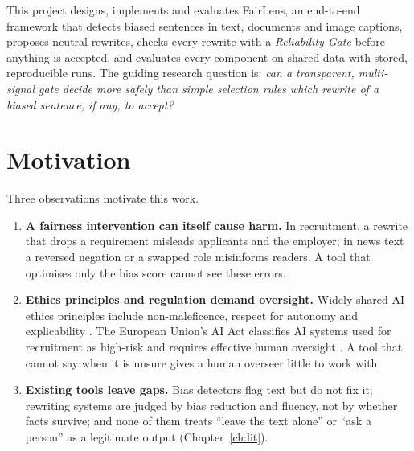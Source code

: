 \documentclass[12pt,a4paper,oneside]{report}
\begin{document}
This project designs, implements and evaluates FairLens, an end-to-end framework that detects biased sentences in text,
documents and image captions, proposes neutral rewrites, checks every rewrite with a \emph{Reliability Gate} before
anything is accepted, and evaluates every component on shared data with stored, reproducible runs. The guiding research
question is: \emph{can a transparent, multi-signal gate decide more safely than simple selection rules which rewrite of
a biased sentence, if any, to accept?}

\section{Motivation}
Three observations motivate this work.

\begin{enumerate}
\item \textbf{A fairness intervention can itself cause harm.} In recruitment, a rewrite that drops a requirement
misleads applicants and the employer; in news text a reversed negation or a swapped role misinforms readers. A tool that
optimises only the bias score cannot see these errors.
\item \textbf{Ethics principles and regulation demand oversight.} Widely shared AI ethics principles include
non-maleficence, respect for autonomy and explicability \cite{floridi,jobin}. The European Union's AI Act classifies AI
systems used for recruitment as high-risk and requires effective human oversight \cite{euaiact}. A tool that cannot say
when it is unsure gives a human overseer little to work with.
\item \textbf{Existing tools leave gaps.} Bias detectors flag text but do not fix it; rewriting systems are judged by
bias reduction and fluency, not by whether facts survive; and none of them treats ``leave the text alone'' or ``ask a
person'' as a legitimate output (Chapter~\ref{ch:lit}).
\end{enumerate}
\end{document}
